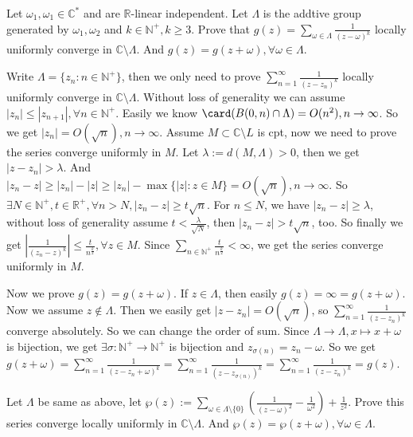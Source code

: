 \documentclass{ctexart}
\begin{document}
\begin{problem}
  Let \(\omega_1,\omega_1 \in \mathbb{C}^*\) and are \(\mathbb{R}\)-linear independent. 
  Let \(\Lambda\) is the addtive group generated by \(\omega_1,\omega_2\) and \(k \in \mathbb{N}^+,k \geq 3 \). 
  Prove that \(g(z)=\sum_{\omega \in \Lambda} \frac{1}{(z-\omega)^k}\) locally uniformly converge in \(\mathbb{C} \setminus \Lambda\). 
  And \(g(z)=g(z+\omega),\forall \omega \in \Lambda\). 
\end{problem}

\begin{solution}
  Write \(\Lambda=\{z_n:n \in \mathbb{N}^+\}\), then we only need to prove \(\sum_{n=1}^{\infty} \frac{1}{(z-z_n)^k}\) locally uniformly converge in \(\mathbb{C} \setminus \Lambda\). 
  Without loss of generality we can assume \(|z_n| \leq |z_{n+1}|,\forall n \in \mathbb{N}^+\). 
  Easily we know \(\card(B(0,n)\cap \Lambda)=O(n^2),n \to \infty\). 
  So we get \(|z_n|=O(\sqrt{n}),n \to \infty\). 
  Assume \(M \subset \mathbb{C}\setminus L\) is cpt, now we need to prove the series converge uniformly in \(M\). 
  Let \(\lambda:=d(M,\Lambda)>0\), then we get \(|z-z_n|>\lambda\). 
  And \(|z_n-z| \geq |z_n|-|z| \geq |z_n|-\max\{|z|:z \in M\}=O(\sqrt{n}),n \to \infty\). 
  So \(\exists N \in \mathbb{N}^+,t \in \mathbb{R}^+,\forall n>N,|z_n-z| \geq t \sqrt{n}\). 
  For \(n \leq N\), we have \(|z_n-z| \geq \lambda\), without loss of generality assume \(t<\frac{\lambda}{\sqrt{N}}\), then \(|z_n-z| >t \sqrt{n}\), too. 
  So finally we get \(\left|\frac{1}{(z_n-z)^k}\right| \leq \frac{t}{n^{ \frac{k}{2}}}, \forall z \in M\). 
  Since \(\sum_{n \in \mathbb{N}^+} \frac{t}{n^{ \frac{k}{2}}}<\infty\), we get the series converge uniformly in \(M\). 

  Now we prove \(g(z)=g(z+\omega)\). If \(z \in \Lambda\), then easily \(g(z)=\infty=g(z+\omega)\). 
  Now we assume \(z \notin \Lambda\). Then we easily get \(|z-z_n|=O(\sqrt{n})\), so \(\sum_{n=1}^{\infty} \frac{1}{(z-z_n)^k}\) converge absolutely. 
  So we can change the order of sum. Since \(\Lambda \to \Lambda,x \mapsto x+\omega\) is bijection, we get \(\exists \sigma:\mathbb{N}^+ \to \mathbb{N}^+\) is bijection 
  and \(z_{\sigma(n)}=z_n-\omega\). 
  So we get \(g(z+\omega)=\sum_{n=1}^{\infty} \frac{1}{(z-z_n+\omega)^k}=\sum_{n=1}^{\infty} \frac{1}{(z-z_{\sigma(n)})^k}=\sum_{n=1}^{\infty} \frac{1}{(z-z_n)^k}=g(z)\). 
\end{solution}

\begin{problem}
  Let \(\Lambda\) be same as above, let \(\wp(z):=\sum_{\omega \in \Lambda \setminus \{0\}} \left(\frac{1}{(z-\omega)^2} -\frac{1}{\omega^2}\right)+\frac{1}{z^2}\). 
  Prove this series converge locally uniformly in \(\mathbb{C} \setminus \Lambda\). 
  And \(\wp(z)=\wp(z+\omega),\forall \omega \in \Lambda\). 
\end{problem}
\end{document}
